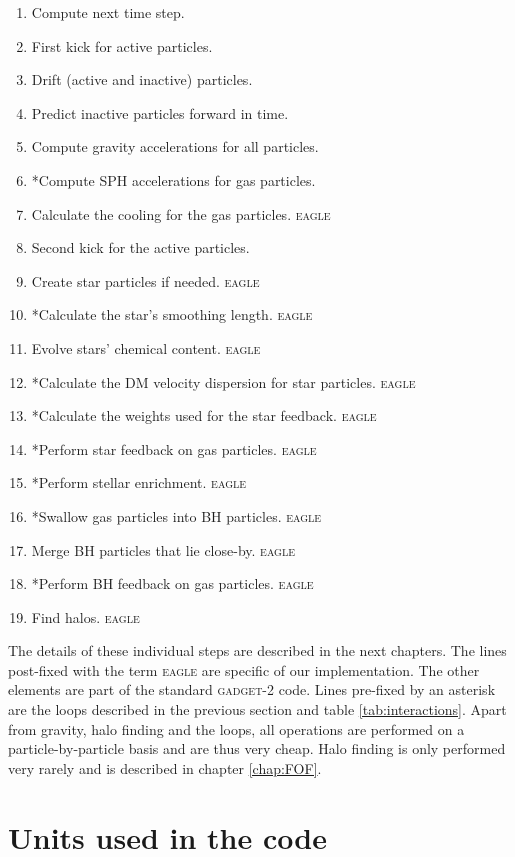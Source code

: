 \documentclass[a4paper,10pt]{report}
\newcommand{\eagle}{\textsc{eagle }}
\newcommand{\gadget}{\textsc{gadget-2 }}
\begin{document}
\begin{enumerate}
 \item Compute next time step.
 \item First kick for active particles.
 \item Drift (active and inactive) particles.
 \item Predict inactive particles forward in time.
 \item Compute gravity accelerations for all particles.
 \item *Compute SPH accelerations for gas particles.
 \item Calculate the cooling for the gas particles. \eagle
 \item Second kick for the active particles.
 \item Create star particles if needed. \eagle
 \item *Calculate the star's smoothing length. \eagle
 \item Evolve stars' chemical content. \eagle
 \item *Calculate the DM velocity dispersion for star particles. \eagle
 \item *Calculate the weights used for the star feedback. \eagle
 \item *Perform star feedback on gas particles. \eagle
 \item *Perform stellar enrichment. \eagle
 \item *Swallow gas particles into BH particles. \eagle
 \item Merge BH particles that lie close-by. \eagle
 \item *Perform BH feedback on gas particles. \eagle
 \item Find halos. \eagle
\end{enumerate}

The details of these individual steps are described in the next chapters. The lines post-fixed with the term \eagle are
specific of our implementation. The other elements are part of the standard \gadget code. Lines pre-fixed by an asterisk
are the loops described in the previous section and table \ref{tab:interactions}. Apart from gravity, halo finding and
the loops, all operations are performed on a particle-by-particle basis and are thus very cheap. Halo finding is only
performed very rarely and is described in chapter \ref{chap:FOF}.

\section{Units used in the code}
\end{document}
